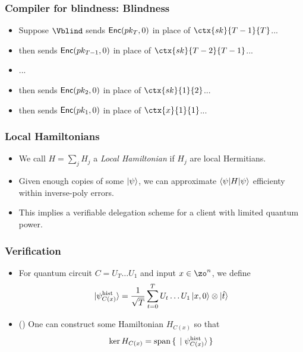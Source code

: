 \documentclass{beamer}
\begin{document}
\begin{frame}
	\frametitle{Compiler for blindness: Blindness}
	\begin{itemize}[<+->]
		\item Suppose $\Vblind$ sends $\mathsf{Enc}(pk_T, 0)$ in place of $\ctx{sk}{T-1}{T}$...
		\item then sends $\mathsf{Enc}(pk_{T-1}, 0)$ in place of $\ctx{sk}{T-2}{T-1}$...
		\item ...
		\item then sends $\mathsf{Enc}(pk_2, 0)$ in place of $\ctx{sk}{1}{2}$...
		\item then sends $\mathsf{Enc}(pk_1, 0)$ in place of $\ctx{x}{1}{1}$...
	\end{itemize}
\end{frame}

\begin{frame}
	\frametitle{Local Hamiltonians}
	\begin{itemize}[<+->]
		\item We call $H=\sum_j H_j$ a \emph{Local Hamiltonian} if $H_j$ are local Hermitians.
		\item Given enough copies of some $\ket\psi$, we can approximate $\braket{\psi|H|\psi}$ efficienty within inverse-poly errors.
		\item This implies a verifiable delegation scheme for a client with limited quantum power.
	\end{itemize}
\end{frame}

\begin{frame}
	\frametitle{Verification}
	\begin{itemize}[<+->]
		\item For quantum circuit $C=U_T\ldots U_1$ and input $x\in\zo^n$, we define $$\ket{\psi_{C(x)}^{\mathrm{hist}}}=\frac{1}{\sqrt{T}}\sum_{t=0}^TU_t\ldots U_1\ket{x,0}\otimes\ket{\hat{t}}$$
		\item (\cite{kitaev2002classical}) One can construct some Hamiltonian $H_{C(x)}$ so that $$\ker H_{C(x)}=\operatorname{span}\set{\ket{\psi_{C(x)}^{\mathrm{hist}}}}$$
	\end{itemize}
\end{frame}
\end{document}
